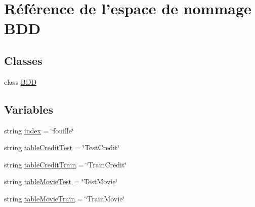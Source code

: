 \hypertarget{namespaceBDD}{\section{Référence de l'espace de nommage B\-D\-D}
\label{namespaceBDD}
}
\subsection*{Classes}
\begin{DoxyCompactItemize}
\item 
class \hyperlink{classBDD_1_1BDD}{B\-D\-D}
\end{DoxyCompactItemize}
\subsection*{Variables}
\begin{DoxyCompactItemize}
\item 
string \hyperlink{namespaceBDD_a5b93a013f8d46f91f8d7b0fc102a42e7}{index} = \char`\"{}fouille\char`\"{}
\item 
string \hyperlink{namespaceBDD_ab065e06b98ff8f50dcdabe5715c5b710}{table\-Credit\-Test} = \char`\"{}Test\-Credit\char`\"{}
\item 
string \hyperlink{namespaceBDD_a5453a62b7989a6ea0d9d1f4016411323}{table\-Credit\-Train} = \char`\"{}Train\-Credit\char`\"{}
\item 
string \hyperlink{namespaceBDD_a1a3347461ee00b8dba8e995423d6acea}{table\-Movie\-Test} = \char`\"{}Test\-Movie\char`\"{}
\item 
string \hyperlink{namespaceBDD_a69bea8ff9373a0baf5bbf3df09f7a3b0}{table\-Movie\-Train} = \char`\"{}Train\-Movie\char`\"{}
\end{DoxyCompactItemize}


